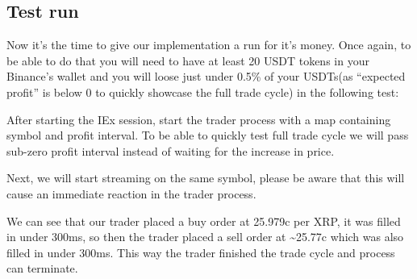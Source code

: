 \documentclass[
  oneside]{book}
\newenvironment{Shaded}{\begin{snugshade}}{\end{snugshade}}
\newcommand{\AttributeTok}[1]{\textcolor[rgb]{0.77,0.63,0.00}{#1}}
\newcommand{\CommentTok}[1]{\textcolor[rgb]{0.56,0.35,0.01}{\textit{#1}}}
\newcommand{\ErrorTok}[1]{\textcolor[rgb]{0.64,0.00,0.00}{\textbf{#1}}}
\newcommand{\ExtensionTok}[1]{#1}
\newcommand{\KeywordTok}[1]{\textcolor[rgb]{0.13,0.29,0.53}{\textbf{#1}}}
\newcommand{\NormalTok}[1]{#1}
\newcommand{\OperatorTok}[1]{\textcolor[rgb]{0.81,0.36,0.00}{\textbf{#1}}}
\newcommand{\StringTok}[1]{\textcolor[rgb]{0.31,0.60,0.02}{#1}}
\begin{document}
\hypertarget{test-run}{%
\subsection{Test run}\label{test-run}}

Now it's the time to give our implementation a run for it's money. Once again, to be able to do that you will need to have at least 20 USDT tokens in your Binance's wallet and you will loose just under 0.5\% of your USDTs(as ``expected profit'' is below 0 to quickly showcase the full trade cycle) in the following test:

\begin{Shaded}
\end{Shaded}

After starting the IEx session, start the trader process with a map containing symbol and profit interval. To be able to quickly test full trade cycle we will pass sub-zero profit interval instead of waiting for the increase in price.

Next, we will start streaming on the same symbol, please be aware that this will cause an immediate reaction in the trader process.

We can see that our trader placed a buy order at 25.979c per XRP, it was filled in under 300ms, so then the trader placed a sell order at \textasciitilde25.77c
which was also filled in under 300ms. This way the trader finished the trade
cycle and process can terminate.
\end{document}

